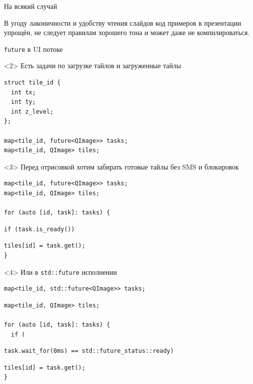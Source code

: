 \documentclass[aspectratio=169,hyperref={unicode},17pt]{beamer}
\begin{document}
\begin{frame}[t]{На всякий случай}

В угоду лаконичности и удобству чтения слайдов код примеров в презентации упрощён, не следует правилам хорошего тона и
может даже не компилироваться.
\end{frame}

\begin{frame}[fragile,t]{\texttt{future} в UI потоке}
\begin{onlyenv}<2>
Есть задачи по загрузке тайлов и загруженные тайлы

 \begin{lstlisting}[style=cppcode]
struct tile_id {
  int tx;
  int ty;
  int z_level;
};

map<tile_id, future<QImage>> tasks;
map<tile_id, QImage> tiles;
 \end{lstlisting}
\end{onlyenv}
\begin{onlyenv}<3>
Перед отрисовкой хотим забирать готовые тайлы без SMS и блокировок
 \begin{lstlisting}[style=cppcode,aboveskip=0pt,belowskip=0pt]
map<tile_id, future<QImage>> tasks;
map<tile_id, QImage> tiles;

for (auto [id, task]: tasks) {
\end{lstlisting}
\begin{lstlisting}[style=cppcode,backgroundcolor=\color{gray!30},aboveskip=0pt,belowskip=0pt]
  if (task.is_ready())
\end{lstlisting}
\begin{lstlisting}[style=cppcode,aboveskip=0pt,belowskip=0pt]
    tiles[id] = task.get();
}
 \end{lstlisting}
\end{onlyenv}
\begin{onlyenv}<4>
Или в \texttt{std::future} исполнении
 \begin{lstlisting}[style=cppcode,backgroundcolor=\color{gray!30},aboveskip=0pt,belowskip=0pt]
map<tile_id, std::future<QImage>> tasks;
\end{lstlisting}
\begin{lstlisting}[style=cppcode,aboveskip=0pt,belowskip=0pt]
map<tile_id, QImage> tiles;

for (auto [id, task]: tasks) {
  if (
\end{lstlisting}
\begin{lstlisting}[style=cppcode,backgroundcolor=\color{gray!30},aboveskip=0pt,belowskip=0pt]
    task.wait_for(0ms) == std::future_status::ready)
\end{lstlisting}
\begin{lstlisting}[style=cppcode,aboveskip=0pt,belowskip=0pt]
    tiles[id] = task.get();
}
 \end{lstlisting}
\end{onlyenv}
\end{frame}
\end{document}
